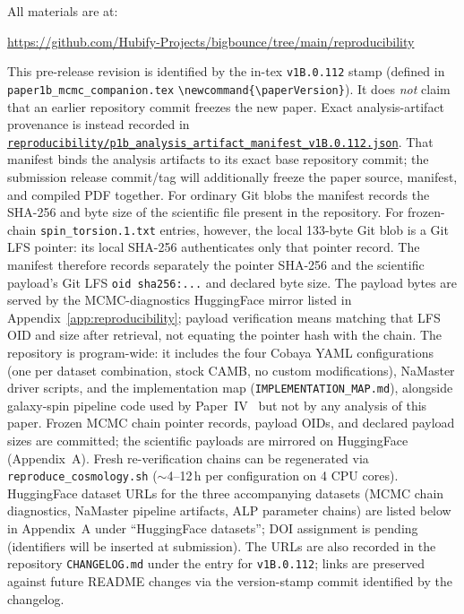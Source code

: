 \documentclass[aps,prd,twocolumn,superscriptaddress,showpacs,preprintnumbers,nofootinbib,longbibliography,floatfix]{revtex4-2}
\newcommand{\repoBase}{https://github.com/Hubify-Projects/bigbounce/blob/main}
\newcommand{\artifact}[1]{\href{\repoBase/#1}{\nolinkurl{#1}}}
\newcommand{\paperVersion}{v1B.0.112}
\begin{document}
All materials are at:
\begin{center}
\url{https://github.com/Hubify-Projects/bigbounce/tree/main/reproducibility}
\end{center}
This pre-release revision is identified by the in-tex
\texttt{\paperVersion} stamp (defined in
\texttt{paper1b\_mcmc\_companion.tex} \texttt{\textbackslash newcommand\{\textbackslash paperVersion\}}).
It does \emph{not} claim that an earlier repository commit freezes the new
paper. Exact analysis-artifact provenance is instead recorded in
\artifact{reproducibility/p1b_analysis_artifact_manifest_v1B.0.112.json}.
That manifest binds the analysis artifacts to its exact base repository commit;
the submission release commit/tag will additionally freeze the paper source,
manifest, and compiled PDF together.
For ordinary Git blobs the manifest records the SHA-256 and byte size of the
scientific file present in the repository. For frozen-chain
\texttt{spin\_torsion.1.txt} entries, however, the local 133-byte Git blob is
a Git LFS pointer: its local SHA-256 authenticates only that pointer record.
The manifest therefore records separately the pointer SHA-256 and the
scientific payload's Git LFS \texttt{oid sha256:...} and declared byte size.
The payload bytes are served by the MCMC-diagnostics HuggingFace mirror listed
in Appendix~\ref{app:reproducibility}; payload verification means matching that
LFS OID and size after retrieval, not equating the pointer hash with the chain.
The repository is program-wide: it includes the four Cobaya YAML
configurations (one per dataset
combination, stock CAMB, no custom modifications),
NaMaster driver scripts, and the implementation map
(\texttt{IMPLEMENTATION\_MAP.md}), alongside galaxy-spin pipeline code used
by Paper~IV~\cite{Golden2026P4} but not by any analysis of this paper.
Frozen MCMC chain pointer records, payload OIDs, and declared payload sizes are
committed; the scientific payloads are mirrored on HuggingFace (Appendix~A).
Fresh re-verification chains can be regenerated via
\texttt{reproduce\_cosmology.sh} ($\sim$4--12\,h per configuration on
4 CPU cores).
HuggingFace dataset URLs for the three accompanying datasets (MCMC chain
diagnostics, NaMaster pipeline artifacts, ALP parameter chains) are listed
below in Appendix~A under ``HuggingFace datasets''; DOI assignment is
pending (identifiers will be inserted at submission). The URLs are also
recorded in the repository \texttt{CHANGELOG.md} under the entry for
\texttt{\paperVersion}; links are preserved against future README changes
via the version-stamp commit identified by the changelog.
\end{document}
